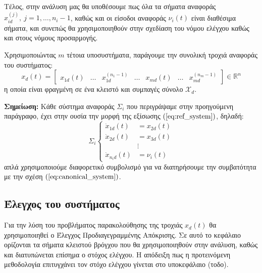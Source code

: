 Τέλος, στην ανάλυση μας θα υποθέσουμε πως όλα τα σήματα αναφοράς $x_{id}^{(j)},\: j = 1,\dots,n_i-1$, καθώς και οι είσοδοι αναφοράς $\nu_i(t)$ είναι διαθέσιμα σήματα, και συνεπώς θα χρησιμοποιηθούν στην σχεδίαση του νόμου ελέγχου καθώς και στους νόμους προσαρμογής.


Χρησιμοποιώντας $m$ τέτοια υποσυστήματα, παράγουμε την συνολική τροχιά αναφοράς του συστήματος:
\begin{equation}
x_d(t) = \begin{bmatrix}
x_{1d}(t) & \dots & x_{1d}^{(n_1-1)} & \dots & 
x_{md}(t) & \dots & x_{md}^{(n_m-1)}
\end{bmatrix} \in \mathbb{R}^n
\label{eq:x_desired}
\end{equation}
η οποία είναι φραγμένη σε ένα κλειστό και συμπαγές σύνολο $\mathcal{X}_d$.



\textbf{Σημείωση:} Κάθε σύστημα αναφοράς $\Sigma_i$ που περιγράψαμε στην προηγούμενη παράγραφο, έχει στην ουσία την μορφή της εξίσωσης $(\ref{eq:ref_system})$, δηλαδή:
\begin{equation*}
\Sigma_i
\begin{cases}
\dot{x}_{1d}(t) &= x_{2d}(t)  \\
\dot{x}_{2d}(t) &= x_{3d}(t) \\
                & \vdots \\
\dot{x}_{n_i d}(t) &= \nu_i(t)
\end{cases}
\label{eq:ref_subsystem}
\end{equation*}
απλά χρησιμοποιούμε διαφορετικό συμβολισμό για να διατηρήσουμε την συμβατότητα με την σχέση $(\ref{eq:canonical_system})$.


\subsection{Έλεγχος του συστήματος} %
Για την λύση του προβλήματος παρακολούθησης της τροχιάς $x_d(t)$ θα χρησιμοποιηθεί ο Έλεγχος Προδιαγεγραμμένης Απόκρισης. Σε αυτό το κεφάλαιο ορίζονται τα σήματα κλειστού βρόγχου που θα χρησιμοποιηθούν στην ανάλυση, καθώς και διατυπώνεται επίσημα ο στόχος ελέγχου. Η απόδειξη πως η προτεινόμενη μεθοδολογία επιτυγχάνει τον στόχο ελέγχου γίνεται στο υποκεφάλαιο (τοδο).

